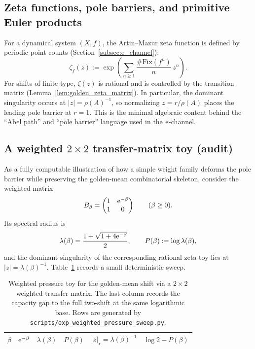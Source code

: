 \subsection{Zeta functions, pole barriers, and primitive Euler products}
\label{subsec:zeta_pressure_pole_barrier}

For a dynamical system $(X,f)$, the Artin--Mazur zeta function is defined by periodic-point counts (Section~\ref{subsec:e_channel}):
\[
\zeta_f(z):=\exp\!\left(\sum_{n\ge 1}\frac{\#\mathrm{Fix}(f^n)}{n}\,z^n\right).
\]
For shifts of finite type, $\zeta(z)$ is rational and is controlled by the transition matrix (Lemma~\ref{lem:golden_zeta_matrix}).
In particular, the dominant singularity occurs at $|z|=\rho(A)^{-1}$, so normalizing $z=r/\rho(A)$ places the leading pole barrier at $r=1$.
This is the minimal algebraic content behind the ``Abel path'' and ``pole barrier'' language used in the $\mathrm{e}$-channel.

\subsection{A weighted $2\times 2$ transfer-matrix toy (audit)}
\label{subsec:weighted_transfer_matrix_toy}

\AuditTag As a fully computable illustration of how a simple weight family deforms the pole barrier while preserving the golden-mean combinatorial skeleton,
consider the weighted matrix
\[
B_\beta=\begin{pmatrix}1&\mathrm{e}^{-\beta}\\ 1&0\end{pmatrix}\qquad(\beta\ge 0).
\]
Its spectral radius is
\[
\lambda(\beta)=\frac{1+\sqrt{1+4\mathrm{e}^{-\beta}}}{2},
\qquad
P(\beta):=\log\lambda(\beta),
\]
and the dominant singularity of the corresponding rational zeta toy lies at $|z|=\lambda(\beta)^{-1}$.
Table~\ref{tab:weighted_pressure_sweep} records a small deterministic sweep.

\begin{table}[H]
\centering
\scriptsize
\setlength{\tabcolsep}{6pt}
\renewcommand{\arraystretch}{1.15}
\begin{tabular}{rrrrrr}
\toprule
$\beta$ & $\mathrm{e}^{-\beta}$ & $\lambda(\beta)$ & $P(\beta)$ & $|z|_\star=\lambda(\beta)^{-1}$ & $\log 2 - P(\beta)$ \\
\midrule
%
\end{tabular}
\caption{Weighted pressure toy for the golden-mean shift via a $2\times 2$ weighted transfer matrix. The last column records the capacity gap to the full two-shift at the same logarithmic base. Rows are generated by \texttt{scripts/exp\_weighted\_pressure\_sweep.py}.}
\label{tab:weighted_pressure_sweep}
\end{table}

